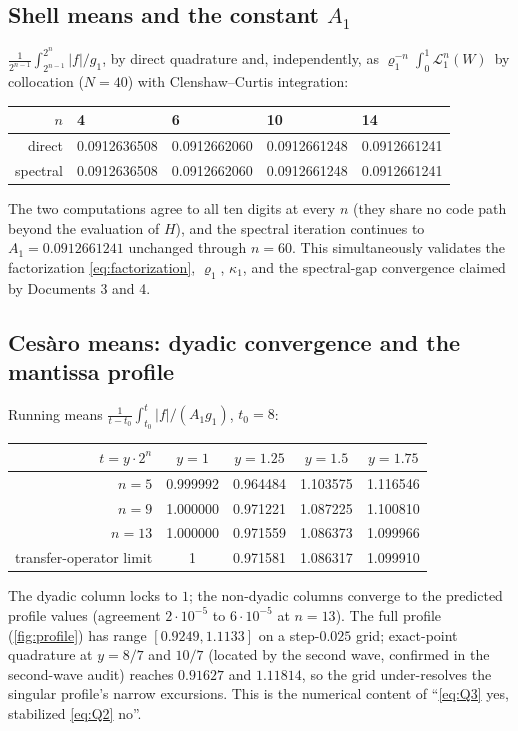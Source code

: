 \documentclass[11pt,oneside]{article}
\theoremstyle{definition}
\theoremstyle{remark}
\newcommand{\Lop}{\mathcal L}
\begin{document}
\subsection{Shell means and the constant $A_1$}
\label{ssec:shells}

$\frac{1}{2^{n-1}}\int_{2^{n-1}}^{2^n}|f|/g_1$, by direct quadrature and,
independently, as $\varrho_1^{-n}\int_0^1\Lop_1^n(W)\,$ by collocation
($N=40$) with Clenshaw--Curtis integration:
\begin{center}
\small
\begin{tabular}{@{}rllll@{}}
\toprule
$n$ & 4 & 6 & 10 & 14 \\
\midrule
direct   & 0.0912636508 & 0.0912662060 & 0.0912661248 & 0.0912661241\\
spectral & 0.0912636508 & 0.0912662060 & 0.0912661248 & 0.0912661241\\
\bottomrule
\end{tabular}
\end{center}
The two computations agree to all ten digits at every $n$ (they share no
code path beyond the evaluation of $H$), and the spectral iteration
continues to $A_1=0.0912661241$ unchanged through $n=60$.  This
simultaneously validates the factorization \eqref{eq:factorization},
$\varrho_1$, $\kappa_1$, and the spectral-gap convergence claimed by
Documents 3 and 4.

\subsection{Ces\`aro means: dyadic convergence and the mantissa profile}
\label{ssec:cesaro}

Running means $\frac{1}{t-t_0}\int_{t_0}^{t}|f|/(A_1g_1)$, $t_0=8$:
\begin{center}
\small
\begin{tabular}{@{}rcccc@{}}
\toprule
$t=y\cdot2^n$ & $y=1$ & $y=1.25$ & $y=1.5$ & $y=1.75$\\
\midrule
$n=5$  & 0.999992 & 0.964484 & 1.103575 & 1.116546\\
$n=9$  & 1.000000 & 0.971221 & 1.087225 & 1.100810\\
$n=13$ & 1.000000 & 0.971559 & 1.086373 & 1.099966\\
transfer-operator limit & 1 & 0.971581 & 1.086317 & 1.099910\\
\bottomrule
\end{tabular}
\end{center}
The dyadic column locks to $1$; the non-dyadic columns converge to the
predicted profile values (agreement $2\cdot10^{-5}$ to $6\cdot10^{-5}$ at
$n=13$).  The full profile (\cref{fig:profile}) has range
$[0.9249,1.1133]$ on a step-$0.025$ grid; exact-point quadrature at
$y=8/7$ and $10/7$ (located by the second wave, confirmed in the
second-wave audit) reaches $0.91627$ and $1.11814$, so the grid
under-resolves the singular profile's narrow excursions.  This is the
numerical content of ``\eqref{eq:Q3} yes, stabilized \eqref{eq:Q2}
no''.
\end{document}
